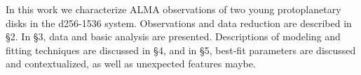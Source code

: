 In this work we characterize ALMA observations of two young protoplanetary disks in the d256-1536 system. Observations and data reduction are described in \S2. In \S3, data and basic analysis are presented. Descriptions of modeling and fitting techniques are discussed in \S4, and in \S5, best-fit parameters are discussed and contextualized, as well as unexpected features maybe.





















